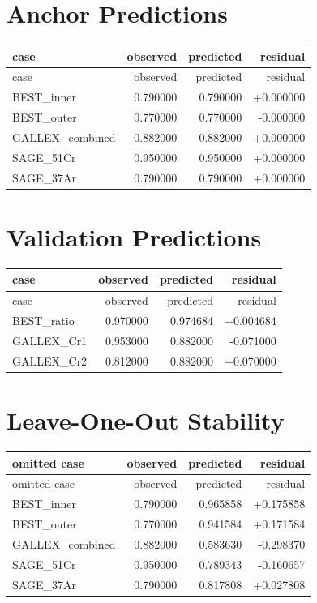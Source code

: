 \documentclass[11pt]{article}
\begin{document}
\section*{Anchor Predictions}
\begin{longtable}{lrrr}
\toprule
case & observed & predicted & residual \\
\midrule
\endfirsthead
\toprule
case & observed & predicted & residual \\
\midrule
\endhead
BEST\_inner & 0.790000 & 0.790000 & +0.000000 \\BEST\_outer & 0.770000 & 0.770000 & -0.000000 \\GALLEX\_combined & 0.882000 & 0.882000 & +0.000000 \\SAGE\_51Cr & 0.950000 & 0.950000 & +0.000000 \\SAGE\_37Ar & 0.790000 & 0.790000 & +0.000000 \\
\bottomrule
\end{longtable}

\section*{Validation Predictions}
\begin{longtable}{lrrr}
\toprule
case & observed & predicted & residual \\
\midrule
\endfirsthead
\toprule
case & observed & predicted & residual \\
\midrule
\endhead
BEST\_ratio & 0.970000 & 0.974684 & +0.004684 \\GALLEX\_Cr1 & 0.953000 & 0.882000 & -0.071000 \\GALLEX\_Cr2 & 0.812000 & 0.882000 & +0.070000 \\
\bottomrule
\end{longtable}

\section*{Leave-One-Out Stability}
\begin{longtable}{lrrr}
\toprule
omitted case & observed & predicted & residual \\
\midrule
\endfirsthead
\toprule
omitted case & observed & predicted & residual \\
\midrule
\endhead
BEST\_inner & 0.790000 & 0.965858 & +0.175858 \\BEST\_outer & 0.770000 & 0.941584 & +0.171584 \\GALLEX\_combined & 0.882000 & 0.583630 & -0.298370 \\SAGE\_51Cr & 0.950000 & 0.789343 & -0.160657 \\SAGE\_37Ar & 0.790000 & 0.817808 & +0.027808 \\
\bottomrule
\end{longtable}
\end{document}
